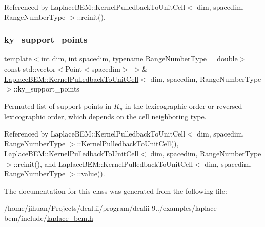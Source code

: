 Referenced by Laplace\+B\+E\+M\+::\+Kernel\+Pulledback\+To\+Unit\+Cell$<$ dim, spacedim, Range\+Number\+Type $>$\+::reinit().

\mbox{\label{classLaplaceBEM_1_1KernelPulledbackToUnitCell_a92971044a5f8ce2f61688858a3deac8e}} 
\subsubsection{\texorpdfstring{ky\+\_\+support\+\_\+points}{ky\_support\_points}}
{\footnotesize\ttfamily template$<$int dim, int spacedim, typename Range\+Number\+Type = double$>$ \\
const std\+::vector$<$Point$<$spacedim$>$ $>$\& \hyperlink{classLaplaceBEM_1_1KernelPulledbackToUnitCell}{Laplace\+B\+E\+M\+::\+Kernel\+Pulledback\+To\+Unit\+Cell}$<$ dim, spacedim, Range\+Number\+Type $>$\+::ky\+\_\+support\+\_\+points\hspace{0.3cm}{\ttfamily [private]}}

Permuted list of support points in $K_y$ in the lexicographic order or reversed lexicographic order, which depends on the cell neighboring type. 

Referenced by Laplace\+B\+E\+M\+::\+Kernel\+Pulledback\+To\+Unit\+Cell$<$ dim, spacedim, Range\+Number\+Type $>$\+::\+Kernel\+Pulledback\+To\+Unit\+Cell(), Laplace\+B\+E\+M\+::\+Kernel\+Pulledback\+To\+Unit\+Cell$<$ dim, spacedim, Range\+Number\+Type $>$\+::reinit(), and Laplace\+B\+E\+M\+::\+Kernel\+Pulledback\+To\+Unit\+Cell$<$ dim, spacedim, Range\+Number\+Type $>$\+::value().



The documentation for this class was generated from the following file\+:\begin{DoxyCompactItemize}
\item 
/home/jihuan/\+Projects/deal.\+ii/program/dealii-\/9../examples/laplace-\/bem/include/\hyperlink{laplace__bem_8h}{laplace\+\_\+bem.\+h}\end{DoxyCompactItemize}
